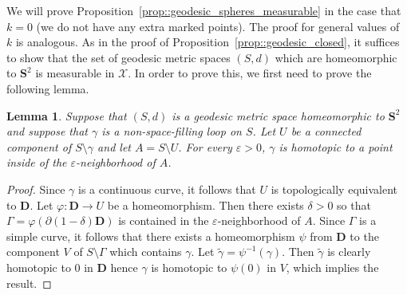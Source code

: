 \documentclass[JEP,XML,SOM,Unicode]{cedram}
\let\mathcal\mathscr
\let\epsilon\varepsilon
\theoremstyle{plain}
\numberwithin{theorem}{section}
\newtheorem{lemma}[theorem]{Lemma}
\theoremstyle{definition}
\newcommand{\D}{\mathbf{D}}
\renewcommand{\S}{{\mathbf S}}
\newcommand{\gh}{{\mathcal X}}
\let\wt\widetilde
\begin{document}
We will prove Proposition~\ref{prop::geodesic_spheres_measurable} in the case that $k = 0$ (\ie we do not have any extra marked points). The proof for general values of $k$ is analogous. As in the proof of Proposition~\ref{prop::geodesic_closed}, it suffices to show that the set of geodesic metric spaces $(S,d)$ which are homeomorphic to $\S^2$ is measurable in $\gh$. In order to prove this, we first need to prove the following lemma.

\begin{lemma}
\label{lem::sphere_contract}
Suppose that $(S,d)$ is a geodesic metric space homeomorphic to $\S^2$ and suppose that $\gamma$ is a non-space-filling loop on $S$. Let $U$ be a connected component of $S \setminus \gamma$ and let $A = S \setminus U$. For every $\epsilon > 0$, $\gamma$ is homotopic to a point inside of the $\epsilon$-neighborhood of $A$.
\end{lemma}
\begin{proof}
Since $\gamma$ is a continuous curve, it follows that $U$ is topologically equivalent to $\D$. Let $\varphi \colon \D \to U$ be a homeomorphism. Then there exists $\delta > 0$ so that $\Gamma = \varphi(\partial (1-\delta) \D)$ is contained in the $\epsilon$-neighborhood of $A$. Since $\Gamma$ is a simple curve, it follows that there exists a homeomorphism $\psi$ from $\D$ to the component $V$ of $S \setminus \Gamma$ which contains $\gamma$. Let $\wt{\gamma} = \psi^{-1}(\gamma)$. Then $\wt{\gamma}$ is clearly homotopic to $0$ in $\D$ hence $\gamma$ is homotopic to $\psi(0)$ in $V$, which implies the result.
\end{proof}
\end{document}
